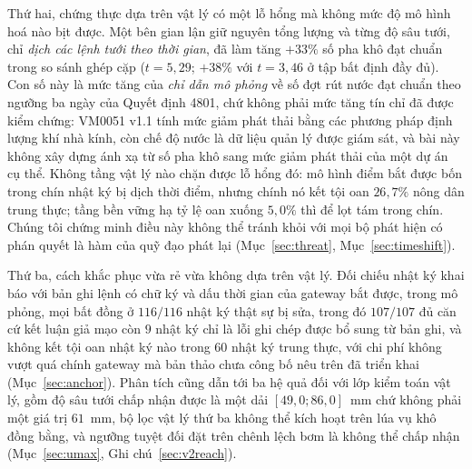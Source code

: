 Thứ hai, chứng thực dựa trên vật lý có một lỗ hổng mà không mức độ mô hình hoá nào bịt
được. Một bên gian lận giữ nguyên tổng lượng và từng độ sâu tưới, chỉ \emph{dịch các lệnh tưới
theo thời gian}, đã làm tăng $+33\%$ số pha khô đạt chuẩn trong so sánh ghép cặp ($t=5{,}29$; $+38\%$ với $t=3{,}46$ ở tập bất định đầy đủ). Con số này là mức tăng của \emph{chỉ dẫn mô phỏng} về số đợt rút nước đạt chuẩn theo ngưỡng ba ngày của Quyết định 4801, chứ không phải mức tăng tín chỉ đã được kiểm chứng: VM0051 v1.1 tính mức giảm phát thải bằng các phương pháp định lượng khí nhà kính, còn chế độ nước là dữ liệu quản lý được giám sát, và bài này không xây dựng ánh xạ từ số pha khô sang mức giảm phát thải của một dự án cụ thể. Không tầng vật lý nào chặn được lỗ hổng
đó: mô hình điểm bắt được bốn trong chín nhật ký bị dịch thời điểm, nhưng chính nó kết
tội oan $26{,}7\%$ nông dân trung thực; tầng bền vững hạ tỷ lệ oan xuống $5{,}0\%$ thì để
lọt tám trong chín. Chúng tôi chứng minh điều này không thể tránh khỏi với mọi bộ phát
hiện có phán quyết là hàm của quỹ đạo phát lại (Mục~\ref{sec:threat},
Mục~\ref{sec:timeshift}).

Thứ ba, cách khắc phục vừa rẻ vừa không dựa trên vật lý. Đối chiếu nhật ký khai báo với
bản ghi lệnh có chữ ký và dấu thời gian của gateway bắt được, trong mô phỏng, mọi bất đồng ở
$116/116$
nhật ký thật sự bị sửa, trong đó $107/107$ đủ căn cứ kết luận giả mạo còn $9$ nhật ký
chỉ là lỗi ghi chép được bổ sung từ bản ghi, và không kết tội oan nhật ký nào trong
$60$ nhật ký trung thực, với chi phí không vượt quá chính gateway mà bản thảo chưa công bố nêu trên đã triển khai
(Mục~\ref{sec:anchor}). Phân tích cũng dẫn tới ba hệ quả đối với lớp kiểm toán vật lý, gồm
độ sâu tưới chấp nhận được là một dải $[49{,}0; 86{,}0]$~mm chứ không phải một giá trị $61$~mm,
bộ lọc vật lý thứ ba không thể kích hoạt trên lúa vụ khô đồng bằng, và ngưỡng tuyệt đối
đặt trên chênh lệch bơm là không thể chấp nhận (Mục~\ref{sec:umax},
Ghi chú~\ref{sec:v2reach}).